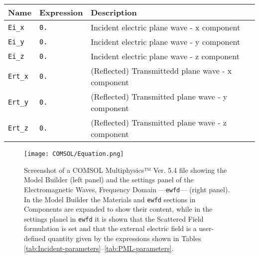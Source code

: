\begin{sidewaystable}
\begin{tabular*}{.9606\textwidth}{ |l|l|l| }
     \hline \hline
    \end{tabular*}
 \vspace*{1.5em}
 \caption{Local definitions for COMSOL simulation: Component/Definitions/Variables. The below variables are locally defined in the subvolume  \lstinline!PML Domain!.  }
 \label{tab:PML-parameters}
     \begin{tabular*}{.501\textwidth}{ |l|l|l| }
     \hline
     \textbf{Name}          &   \textbf{Expression}              &   \textbf{Description} \\ \hline \hline
     \lstinline!Ei_x!       &   \lstinline!0.!                   &   Incident electric plane wave - x component \\
     \lstinline!Ei_y!       &   \lstinline!0.!                   &   Incident electric plane wave - y component \\
     \lstinline!Ei_z!       &   \lstinline!0.!                   &   Incident electric plane wave - z component \\
     \lstinline!Ert_x!      &   \lstinline!0.!                   &   (Reflected) Transmittedd plane wave - x component \\
     \lstinline!Ert_y!      &   \lstinline!0.!                   &   (Reflected) Transmitted plane wave - y component  \\
     \lstinline!Ert_z!      &   \lstinline!0.!                   &   (Reflected) Transmitted plane wave - z component \\
     \hline \hline
    \end{tabular*}
\end{sidewaystable}

\begin{figure}[h!]
    \centering
\texttt{[image: COMSOL/Equation.png]}
\caption[COMSOl File Screenshot: Components/Material and Components/ewfd]{Screenshot of a COMSOL Multiphysics™ Ver. 5.4 file showing the Model Builder (left panel) and the settings panel of the Electromagnetic Waves, Frequency Domain ---\lstinline!ewfd!--- (right panel). In the Model Builder the Materials and \lstinline!ewfd! sections in Components are expanded to show their content, while in the settings planel in \lstinline!ewfd! it is shown that the Scattered Field formulation is set and that the external electric field is a user-defined quantity given by the expressions shown in Tables \ref{tab:Incident-parameters}--\ref{tab:PML-parameters}.}
\label{fig:COMSOL-Eq}
\end{figure}


